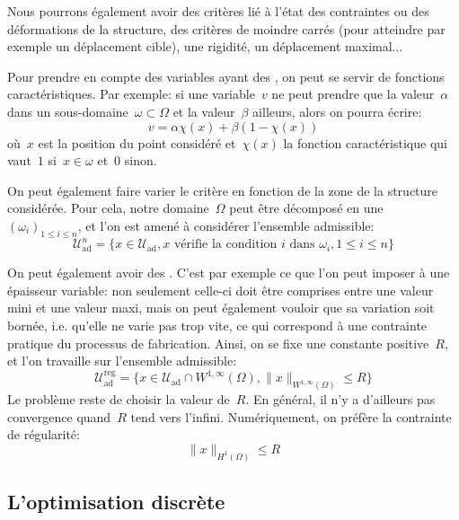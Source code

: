 Nous pourrons également avoir des critères lié à l'état des contraintes ou des déformations de la structure, des critères de moindre carrés (pour atteindre par exemple un déplacement cible), une rigidité, un déplacement maximal...

\medskip
Pour prendre en compte des variables ayant des , on peut se servir de fonctions caractéristiques.
Par  exemple: si une variable~$v$ ne peut prendre que la valeur~$\alpha$ dans un sous-domaine~$\omega\subset\Omega$ et la valeur~$\beta$ ailleurs, alors on pourra écrire:
\begin{equation}
v = \alpha \chi(x) + \beta(1-\chi(x))
\end{equation}
où~$x$ est la position du point considéré et~$\chi(x)$ la fonction caractéristique qui vaut~$1$ si~$x\in\omega$ et~$0$ sinon.

\medskip
On peut également faire varier le critère en fonction de la zone de la structure considérée.
Pour cela, notre domaine~$\Omega$ peut être décomposé en une ~$(\omega_i)_{1\le i\le n}$, et l'on est amené à considérer l'ensemble admissible:
\begin{equation}
\mathscr{U}^n_{\text{ad}}=\{ x\in \mathscr{U}_{\text{ad}}, x \text{ vérifie la condition } i \text{ dans } \omega_i, 1\le i\le n\}
\end{equation}

\medskip
On peut également avoir des . C'est par exemple ce que l'on peut imposer à une épaisseur variable: non seulement celle-ci doit être comprises entre une valeur mini et une valeur maxi, mais on peut également vouloir que sa variation soit bornée, i.e. qu'elle ne varie pas trop vite, ce qui correspond à une contrainte pratique du processus de fabrication.
Ainsi, on se fixe une constante positive~$R$, et l'on travaille sur l'ensemble admissible:
\begin{equation}
\mathscr{U}^{\text{reg}}_{\text{ad}}=\{ x\in \mathscr{U}_{\text{ad}} \cap W^{1,\infty}(\Omega), \|x\|_{W^{1,\infty}(\Omega)}\le R\}
\end{equation}
Le problème reste de choisir la valeur de~$R$. En général, il n'y a d'ailleurs pas convergence quand~$R$ tend vers l'infini.
Numériquement, on préfère la contrainte de régularité:
\begin{equation}
\|x\|_{H^1(\Omega)}\le R
\end{equation}

\medskip
\subsection{L'optimisation discrète}\label{Sec-OptDisc}

